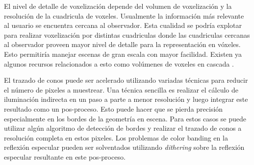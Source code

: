 El nivel de detalle de voxelización depende del volumen de voxelización y la resolución de la cuadricula de voxeles. Usualmente la información más relevante al usuario se encuentra cercana al observador. Esta cualidad se podría explotar para realizar voxelización por distintas cuadriculas donde las cuadriculas cercanas al observador proveen mayor nivel de detalle para la representación en vóxeles. Esto permitiría manejar escenas de gran escala con mayor facilidad. Existen ya algunos recursos relacionados a esto como volúmenes de voxeles en cascada \cite{McLaren:2015:TCL:2775280.2792546}.

El trazado de conos puede ser acelerado utilizando variadas técnicas para reducir el número de pixeles a muestrear. Una técnica sencilla es realizar el cálculo de iluminación indirecta en un paso a parte a menor resolución y luego integrar este resultado como un pos-proceso. Esto puede hacer que se pierda precisión especialmente en los bordes de la geometría en escena. Para estos casos se puede utilizar algún algoritmo de detección de bordes y realizar el trazado de conos a resolución completa en estos pixeles. Los problemas de color banding en la reflexión especular pueden ser solventados utilizando \emph{dithering} sobre la reflexión especular resultante en este pos-proceso.
